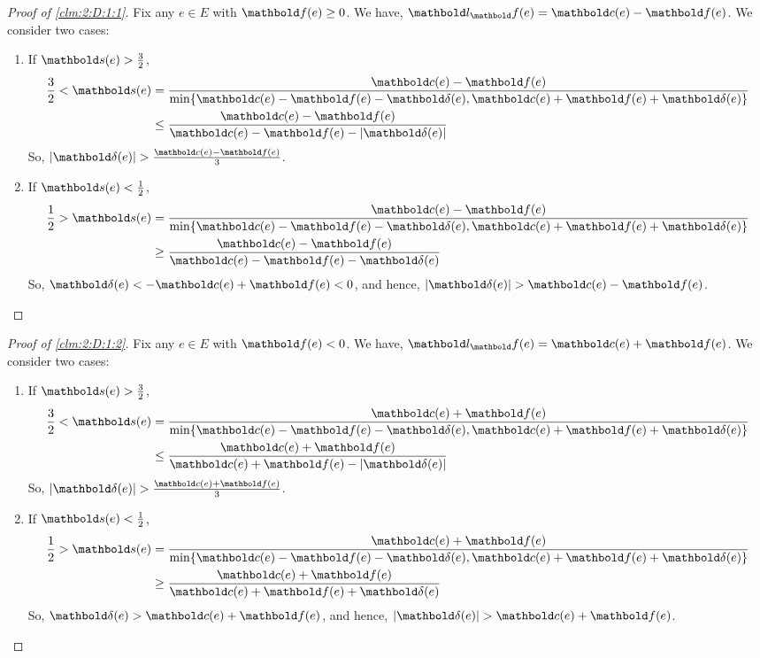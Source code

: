 \documentclass[nobib]{tufte-handout}
\begin{document}
\begin{proof}[Proof of \cref{clm:2:D:1:1}]
Fix any $e \in E$ with $\vf(e) \geq 0$. We have, $\vl_\vf(e) = \vc(e) - \vf(e)$. We consider two cases: \begin{enumerate}
    \item If $\vs(e) > \frac{3}{2}$, \begin{align*}
        \frac{3}{2} < \vs(e) &= \frac{\vc(e) - \vf(e)}{\min\{\vc(e) - \vf(e) - \vdelta(e), \vc(e) + \vf(e) + \vdelta(e)\}} \\
        &\leq \frac{\vc(e) - \vf(e)}{\vc(e) - \vf(e) - |\vdelta(e)|}
    \end{align*} So, $|\vdelta(e)| > \frac{\vc(e) - \vf(e)}{3}$.
    \item If $\vs(e) < \frac{1}{2}$, \begin{align*}
        \frac{1}{2} > \vs(e) &= \frac{\vc(e) - \vf(e)}{\min\{\vc(e) - \vf(e) - \vdelta(e), \vc(e) + \vf(e) + \vdelta(e)\}} \\
        &\geq \frac{\vc(e) - \vf(e)}{\vc(e) - \vf(e) - \vdelta(e)}
    \end{align*} So, $\vdelta(e) < -\vc(e) + \vf(e) < 0$, and hence, $|\vdelta(e)| > \vc(e) - \vf(e)$. \qedhere
\end{enumerate}
\end{proof}

\begin{proof}[Proof of \cref{clm:2:D:1:2}]
Fix any $e \in E$ with $\vf(e) < 0$. We have, $\vl_\vf(e) = \vc(e) + \vf(e)$. We consider two cases: \begin{enumerate}
    \item If $\vs(e) > \frac{3}{2}$, \begin{align*}
        \frac{3}{2} < \vs(e) &= \frac{\vc(e) + \vf(e)}{\min\{\vc(e) - \vf(e) - \vdelta(e), \vc(e) + \vf(e) + \vdelta(e)\}} \\
        &\leq \frac{\vc(e) + \vf(e)}{\vc(e) + \vf(e) - |\vdelta(e)|}
    \end{align*} So, $|\vdelta(e)| > \frac{\vc(e) + \vf(e)}{3}$.
    \item If $\vs(e) < \frac{1}{2}$, \begin{align*}
        \frac{1}{2} > \vs(e) &= \frac{\vc(e) + \vf(e)}{\min\{\vc(e) - \vf(e) - \vdelta(e), \vc(e) + \vf(e) + \vdelta(e)\}} \\
        &\geq \frac{\vc(e) + \vf(e)}{\vc(e) + \vf(e) + \vdelta(e)}
    \end{align*} So, $\vdelta(e) > \vc(e) + \vf(e)$, and hence, $|\vdelta(e)| > \vc(e) + \vf(e)$. \qedhere
\end{enumerate}
\end{proof}
\end{document}
